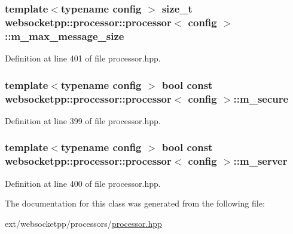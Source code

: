 \subsubsection[{m\+\_\+max\+\_\+message\+\_\+size}]{\setlength{\rightskip}{0pt plus 5cm}template$<$typename config $>$ size\+\_\+t {\bf websocketpp\+::processor\+::processor}$<$ config $>$\+::m\+\_\+max\+\_\+message\+\_\+size\hspace{0.3cm}{\ttfamily [protected]}}\label{classwebsocketpp_1_1processor_1_1processor_a74984af956fccae7e045743cf8ac23b4}


Definition at line 401 of file processor.\+hpp.

\hypertarget{classwebsocketpp_1_1processor_1_1processor_aebab411b1ca4d8ab32ee8c13afcf9274}{}
\subsubsection[{m\+\_\+secure}]{\setlength{\rightskip}{0pt plus 5cm}template$<$typename config $>$ bool const {\bf websocketpp\+::processor\+::processor}$<$ config $>$\+::m\+\_\+secure\hspace{0.3cm}{\ttfamily [protected]}}\label{classwebsocketpp_1_1processor_1_1processor_aebab411b1ca4d8ab32ee8c13afcf9274}


Definition at line 399 of file processor.\+hpp.

\hypertarget{classwebsocketpp_1_1processor_1_1processor_a584edc3698f98e6eb85ab280f491ac9d}{}
\subsubsection[{m\+\_\+server}]{\setlength{\rightskip}{0pt plus 5cm}template$<$typename config $>$ bool const {\bf websocketpp\+::processor\+::processor}$<$ config $>$\+::m\+\_\+server\hspace{0.3cm}{\ttfamily [protected]}}\label{classwebsocketpp_1_1processor_1_1processor_a584edc3698f98e6eb85ab280f491ac9d}


Definition at line 400 of file processor.\+hpp.



The documentation for this class was generated from the following file\+:\begin{DoxyCompactItemize}
\item 
ext/websocketpp/processors/\hyperlink{processor_8hpp}{processor.\+hpp}\end{DoxyCompactItemize}
